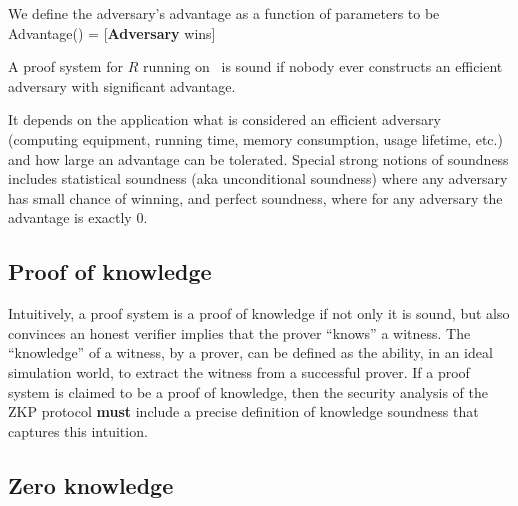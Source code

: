 We define the adversary's advantage as a function of parameters to be \newline
\hphantom{We define the } Advantage(\params) = [\textbf{Adversary} wins]
 
A proof system for $R$ running on \params\ is sound if nobody ever constructs an efficient adversary with significant advantage.




It depends on the application what is considered an efficient adversary (computing equipment, running time, memory consumption, usage lifetime, etc.) and how large an advantage can be tolerated. 
Special strong notions of soundness includes statistical soundness (aka unconditional soundness) where any adversary has small chance of winning, and perfect soundness, where for any adversary the advantage is exactly 0.


\subsection{Proof of knowledge}
\label{sec:security:defs-props:proof-of-knowledge}

Intuitively, a proof system is a proof of knowledge if not only it is sound, but also convinces an honest verifier implies that the prover ``knows'' a witness. 
The ``knowledge'' of a witness, by a prover, can be defined as the ability, in an ideal simulation world, to extract the witness from a successful prover. 
If a proof system is claimed to be a proof of knowledge, then the security analysis of the ZKP protocol \textbf{must} include a precise definition of knowledge soundness that captures this intuition.





\subsection{Zero knowledge}
\label{sec:security:defs-props:zero-knowledge}

